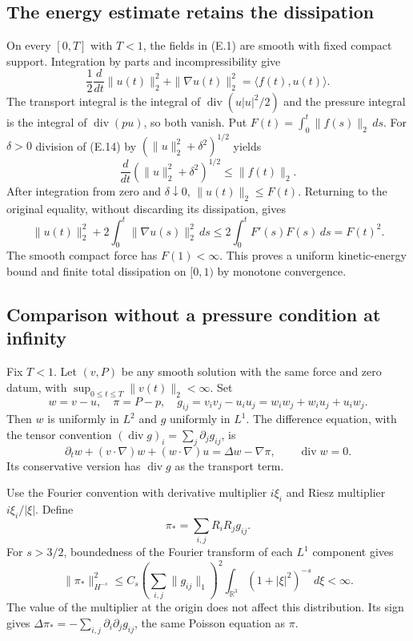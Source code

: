 \documentclass[10pt,a4paper]{article}
\begin{document}
\subsection{The energy estimate retains the dissipation}

On every $[0,T]$ with $T<1$, the fields in (E.1) are smooth with fixed
compact support. Integration by parts and incompressibility give
\[
 \frac12\frac{d}{dt}\|u(t)\|_2^2+\|\nabla u(t)\|_2^2
                =\langle f(t),u(t)\rangle.
 \tag{E.14}
\]
The transport integral is the integral of
$\operatorname{div}(u|u|^2/2)$ and the pressure integral is the integral
of $\operatorname{div}(pu)$, so both vanish. Put
$F(t)=\int_0^t\|f(s)\|_2\,ds$. For $\delta>0$ division of (E.14) by
$(\|u\|_2^2+\delta^2)^{1/2}$ yields
\[
 \frac{d}{dt}(\|u\|_2^2+\delta^2)^{1/2}
 \le\|f(t)\|_2.
\]
After integration from zero and $\delta\downarrow0$, $\|u(t)\|_2\le F(t)$.
Returning to the original equality, without discarding its dissipation,
gives
\[
 \|u(t)\|_2^2+2\int_0^t\|\nabla u(s)\|_2^2\,ds
 \le2\int_0^t F'(s)F(s)\,ds=F(t)^2.
 \tag{E.15}
\]
The smooth compact force has $F(1)<\infty$. This proves a uniform
kinetic-energy bound and finite total dissipation on $[0,1)$ by
monotone convergence.

\subsection{Comparison without a pressure condition at infinity}

Fix $T<1$. Let $(v,P)$ be any smooth solution with the same force and
zero datum, with $\sup_{0\le t\le T}\|v(t)\|_2<\infty$. Set
\[
 w=v-u,\quad \pi=P-p,\quad
 g_{ij}=v_iv_j-u_iu_j=w_iw_j+w_iu_j+u_iw_j.
\]
Then $w$ is uniformly in $L^2$ and $g$ uniformly in $L^1$.
The difference equation, with the tensor convention
$(\operatorname{div}g)_i=\sum_j\partial_jg_{ij}$, is
\[
 \partial_tw+(v\cdot\nabla)w+(w\cdot\nabla)u
       =\Delta w-\nabla\pi,\qquad \operatorname{div}w=0.
 \tag{E.16}
\]
Its conservative version has $\operatorname{div}g$ as the transport
term.

Use the Fourier convention with derivative multiplier $i\xi_i$ and
Riesz multiplier $i\xi_i/|\xi|$. Define
\[
 \pi_*=\sum_{i,j}R_iR_jg_{ij}.
 \tag{E.17}
\]
For $s>3/2$, boundedness of the Fourier transform of each $L^1$
component gives
\[
 \|\pi_*\|_{H^{-s}}^2
 \le C_s\left(\sum_{i,j}\|g_{ij}\|_1\right)^2
          \int_{\mathbb R^3}(1+|\xi|^2)^{-s}\,d\xi<\infty.
\]
The value of the multiplier at the origin does not affect this
distribution. Its sign gives
$\Delta\pi_*=-\sum_{i,j}\partial_i\partial_jg_{ij}$, the same
Poisson equation as $\pi$.
\end{document}
